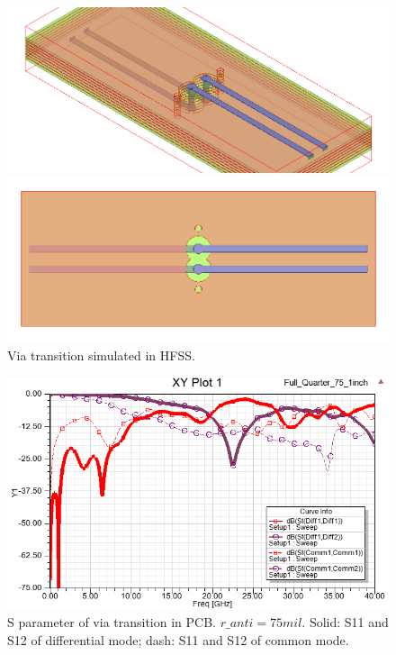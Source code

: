\documentclass{book}  %
\begin{document}
\begin{paper}
\begin{figure}[htbp!]
	\centering	
	\begin{minipage}[b]{0.5\linewidth}
		\includegraphics[width=\textwidth]{./img/PCB/Via_Transition/View_45_Degree.png}
	\end{minipage}%
	\begin{minipage}[b]{0.5\linewidth}
		\includegraphics[width=\textwidth]{./img/PCB/Via_Transition/View_Top.png}
	\end{minipage}
	\caption{Via transition simulated in HFSS.}
\end{figure}

\begin{figure}[htbp!]
	\centering
	\includegraphics[width=0.8\columnwidth]{./img/PCB/Via_Transition/S_parameter.png}
	\caption{S parameter of via transition in PCB. $r\_anti = 75 mil$. Solid: S11 and S12 of differential mode; dash: S11 and S12 of common mode.}
	\label{fig:pcb_via_tran_S} %
\end{figure}


\end{paper}
\end{document}
